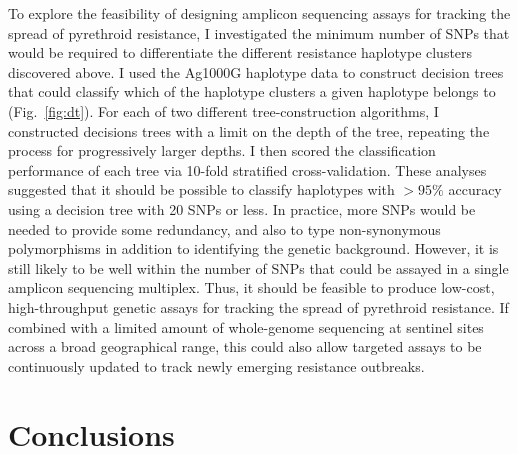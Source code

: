 \begin{refsection}
To explore the feasibility of designing amplicon sequencing assays for tracking the spread of pyrethroid resistance, I investigated the minimum number of SNPs that would be required to differentiate the different resistance haplotype clusters discovered above.
%
I used the Ag1000G haplotype data to construct decision trees that could classify which of the haplotype clusters a given haplotype belongs to (Fig.~\ref{fig:dt}).
%
For each of two different tree-construction algorithms, I constructed decisions trees with a limit on the depth of the tree, repeating the process for progressively larger depths.
%
I then scored the classification performance of each tree via 10-fold stratified cross-validation.
%
These analyses suggested that it should be possible to classify haplotypes with $>95\%$ accuracy using a decision tree with 20 SNPs or less.
%
In practice, more SNPs would be needed to provide some redundancy, and also to type non-synonymous polymorphisms in addition to identifying the genetic background.
%
However, it is still likely to be well within the number of SNPs that could be assayed in a single amplicon sequencing multiplex.
%
Thus, it should be feasible to produce low-cost, high-throughput genetic assays for tracking the spread of pyrethroid resistance.
%
If combined with a limited amount of whole-genome sequencing at sentinel sites across a broad geographical range, this could also allow targeted assays to be continuously updated to track newly emerging resistance outbreaks.



\section{Conclusions}\label{sec:ch6-conclusions}



\end{refsection}
